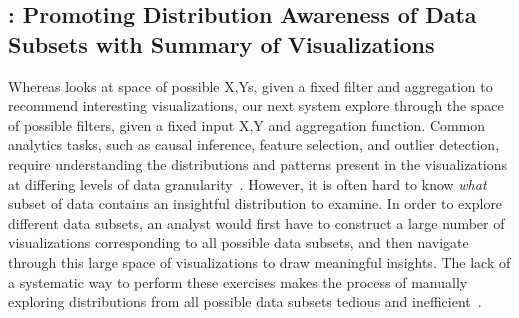 \subsection{\sbd: Promoting Distribution Awareness of Data Subsets with Summary of Visualizations}
\par Whereas \seedb looks at space of possible X,Ys, given a fixed filter and aggregation to recommend interesting visualizations, our next system \sbd explore through the space of possible filters, given a fixed input X,Y and aggregation function. Common analytics tasks, such as causal inference, feature selection, and outlier detection, require understanding the distributions and patterns present in the visualizations at differing levels of data granularity~\cite{Anand2015,Heer2012,Wu2013}. However, it is often hard to know \textit{what} subset of data contains an insightful distribution to examine. In order to explore different data subsets, an analyst would first have to construct a large number of visualizations corresponding to all possible data subsets, and then navigate through this large space of visualizations to draw meaningful insights.  The lack of a systematic way to perform these exercises makes the process of manually exploring distributions from all possible data subsets tedious and inefficient~\cite{Sarawagi1998,Sarawagi2000}.
